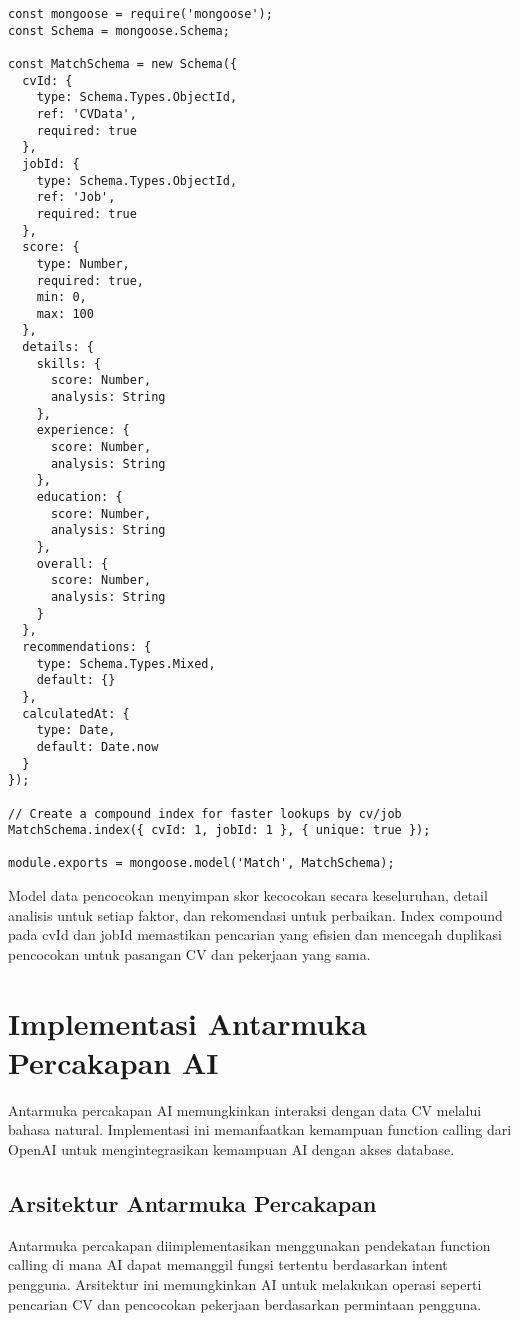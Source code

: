 \begin{verbatim}
const mongoose = require('mongoose');
const Schema = mongoose.Schema;

const MatchSchema = new Schema({
  cvId: {
    type: Schema.Types.ObjectId,
    ref: 'CVData',
    required: true
  },
  jobId: {
    type: Schema.Types.ObjectId,
    ref: 'Job',
    required: true
  },
  score: {
    type: Number,
    required: true,
    min: 0,
    max: 100
  },
  details: {
    skills: {
      score: Number,
      analysis: String
    },
    experience: {
      score: Number,
      analysis: String
    },
    education: {
      score: Number,
      analysis: String
    },
    overall: {
      score: Number,
      analysis: String
    }
  },
  recommendations: {
    type: Schema.Types.Mixed,
    default: {}
  },
  calculatedAt: {
    type: Date,
    default: Date.now
  }
});

// Create a compound index for faster lookups by cv/job
MatchSchema.index({ cvId: 1, jobId: 1 }, { unique: true });

module.exports = mongoose.model('Match', MatchSchema);
\end{verbatim}

Model data pencocokan menyimpan skor kecocokan secara keseluruhan, detail analisis untuk setiap faktor, dan rekomendasi untuk perbaikan. Index compound pada cvId dan jobId memastikan pencarian yang efisien dan mencegah duplikasi pencocokan untuk pasangan CV dan pekerjaan yang sama.

\section{Implementasi Antarmuka Percakapan AI}
Antarmuka percakapan AI memungkinkan interaksi dengan data CV melalui bahasa natural. Implementasi ini memanfaatkan kemampuan function calling dari OpenAI untuk mengintegrasikan kemampuan AI dengan akses database.

\subsection{Arsitektur Antarmuka Percakapan}
Antarmuka percakapan diimplementasikan menggunakan pendekatan function calling di mana AI dapat memanggil fungsi tertentu berdasarkan intent pengguna. Arsitektur ini memungkinkan AI untuk melakukan operasi seperti pencarian CV dan pencocokan pekerjaan berdasarkan permintaan pengguna.

